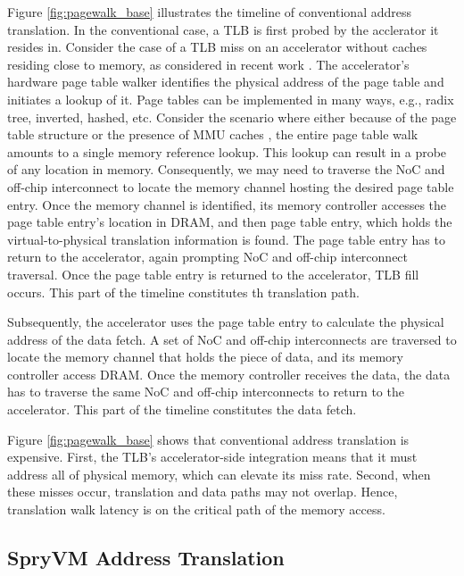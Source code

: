 Figure \ref{fig:pagewalk_base} illustrates the timeline of
conventional address translation. In the conventional case, a TLB is
first probed by the acclerator it resides in. Consider the case of a
TLB miss on an accelerator without caches residing close to memory, as
considered in recent work \cite{haria:devirtualizing,
  picorel:near-memory}. The accelerator's hardware page table walker
identifies the physical address of the page table and initiates a
lookup of it. Page tables can be implemented in many ways, e.g., radix
tree, inverted, hashed, etc. Consider the scenario where either
because of the page table structure or the presence of MMU caches
\cite{bhattacharjee:large-reach, barr:translation}, the entire page
table walk amounts to a single memory reference lookup. This lookup
can result in a probe of any location in memory. Consequently, we may
need to traverse the NoC and off-chip interconnect to locate the
memory channel hosting the desired page table entry. Once the memory
channel is identified, its memory controller accesses the page table
entry's location in DRAM, and then page table entry, which holds the
virtual-to-physical translation information is found. The page table
entry has to return to the accelerator, again prompting NoC and
off-chip interconnect traversal. Once the page table entry is returned
to the accelerator, TLB fill occurs. This part of the timeline
constitutes th translation path.

Subsequently, the accelerator uses the page table entry to calculate
the physical address of the data fetch. A set of NoC and off-chip
interconnects are traversed to locate the memory channel that holds
the piece of data, and its memory controller access DRAM. Once the
memory controller receives the data, the data has to traverse the same
NoC and off-chip interconnects to return to the accelerator. This part
of the timeline constitutes the data fetch.

Figure \ref{fig:pagewalk_base} shows that conventional address
translation is expensive. First, the TLB's accelerator-side
integration means that it must address all of physical memory, which
can elevate its miss rate. Second, when these misses occur,
translation and data paths may not overlap. Hence, translation walk
latency is on the critical path of the memory access.


\subsection{SpryVM Address Translation}

